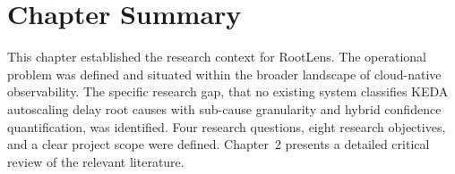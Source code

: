 \section{Chapter Summary}
This chapter established the research context for RootLens. The operational problem was defined and situated within the broader landscape of cloud-native observability. The specific research gap, that no existing system classifies KEDA autoscaling delay root causes with sub-cause granularity and hybrid confidence quantification, was identified. Four research questions, eight research objectives, and a clear project scope were defined. Chapter~2 presents a detailed critical review of the relevant literature.